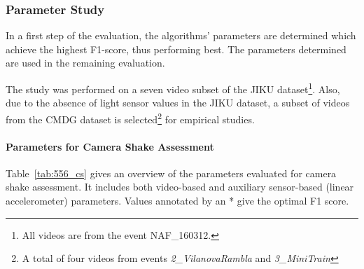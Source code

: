 \subsubsection{Parameter Study}
\label{sec:556_parameters}
In a first step of the evaluation, the algorithms' parameters are determined which achieve the highest F1-score, thus performing best.
The parameters determined are used in the remaining evaluation.

The study was performed on a seven video subset of the JIKU dataset\footnote{All videos are from the event NAF\_160312.}. 
Also, due to the absence of light sensor values in the JIKU dataset, a subset of videos from the CMDG dataset is selected\footnote{A total of four videos from events \textit{2\_VilanovaRambla} and \textit{3\_MiniTrain}} for empirical studies. 
\paragraph{Parameters for Camera Shake Assessment}
Table~\ref{tab:556_cs} gives an overview of the parameters evaluated for camera shake assessment.
It includes both video-based and auxiliary sensor-based (linear accelerometer) parameters. 
Values annotated by an * give the optimal F1 score.
